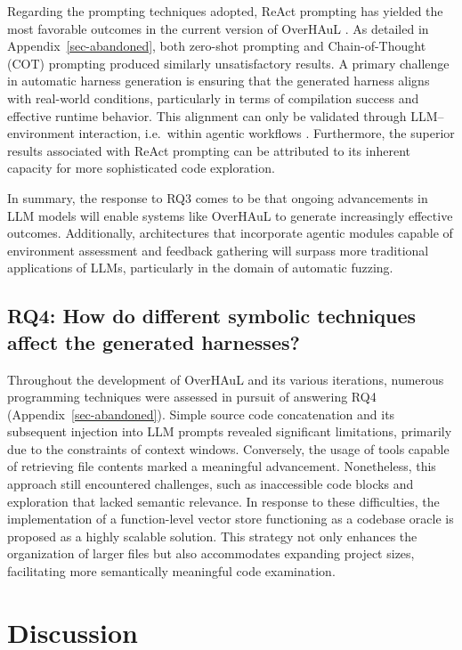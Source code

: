 \documentclass[
  a4paper,
]{scrreprt}
\theoremstyle{definition}
\theoremstyle{remark}
\begin{document}
Regarding the prompting techniques adopted, ReAct prompting has yielded
the most favorable outcomes in the current version of OverHAuL
\autocite{reAct}. As detailed in Appendix~\ref{sec-abandoned}, both
zero-shot prompting and Chain-of-Thought (COT) prompting
\autocite{chainofthought} produced similarly unsatisfactory results. A
primary challenge in automatic harness generation is ensuring that the
generated harness aligns with real-world conditions, particularly in
terms of compilation success and effective runtime behavior. This
alignment can only be validated through LLM--environment interaction,
i.e.~within agentic workflows \autocite{giannone2025}. Furthermore, the
superior results associated with ReAct prompting can be attributed to
its inherent capacity for more sophisticated code exploration.

In summary, the response to RQ3 comes to be that ongoing advancements in
LLM models will enable systems like OverHAuL to generate increasingly
effective outcomes. Additionally, architectures that incorporate agentic
modules capable of environment assessment and feedback gathering will
surpass more traditional applications of LLMs, particularly in the
domain of automatic fuzzing.

\subsection{RQ4: How do different symbolic techniques affect the
generated
harnesses?}\label{rq4-how-do-different-symbolic-techniques-affect-the-generated-harnesses}

Throughout the development of OverHAuL and its various iterations,
numerous programming techniques were assessed in pursuit of answering
RQ4 (Appendix~\ref{sec-abandoned}). Simple source code concatenation and
its subsequent injection into LLM prompts revealed significant
limitations, primarily due to the constraints of context windows.
Conversely, the usage of tools capable of retrieving file contents
marked a meaningful advancement. Nonetheless, this approach still
encountered challenges, such as inaccessible code blocks and exploration
that lacked semantic relevance. In response to these difficulties, the
implementation of a function-level vector store functioning as a
codebase oracle is proposed as a highly scalable solution. This strategy
not only enhances the organization of larger files but also accommodates
expanding project sizes, facilitating more semantically meaningful code
examination.

\section{Discussion}\label{discussion}
\end{document}
